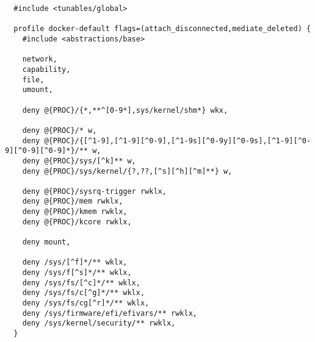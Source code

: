 \begin{lstlisting}
  #include <tunables/global>

  profile docker-default flags=(attach_disconnected,mediate_deleted) {
    #include <abstractions/base>

    network,
    capability,
    file,
    umount,

    deny @{PROC}/{*,**^[0-9*],sys/kernel/shm*} wkx,

    deny @{PROC}/* w,
    deny @{PROC}/{[^1-9],[^1-9][^0-9],[^1-9s][^0-9y][^0-9s],[^1-9][^0-9][^0-9][^0-9]*}/** w,
    deny @{PROC}/sys/[^k]** w,
    deny @{PROC}/sys/kernel/{?,??,[^s][^h][^m]**} w,

    deny @{PROC}/sysrq-trigger rwklx,
    deny @{PROC}/mem rwklx,
    deny @{PROC}/kmem rwklx,
    deny @{PROC}/kcore rwklx,

    deny mount,

    deny /sys/[^f]*/** wklx,
    deny /sys/f[^s]*/** wklx,
    deny /sys/fs/[^c]*/** wklx,
    deny /sys/fs/c[^g]*/** wklx,
    deny /sys/fs/cg[^r]*/** wklx,
    deny /sys/firmware/efi/efivars/** rwklx,
    deny /sys/kernel/security/** rwklx,
  }
\end{lstlisting}

